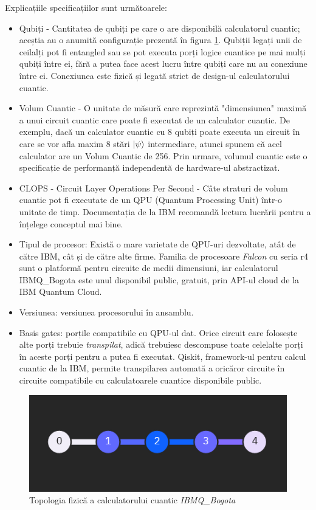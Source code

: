 \documentclass[12pt]{report}
\begin{document}
Explicațiile specificațiilor sunt următoarele:
\begin{itemize}
    \item Qubiți - Cantitatea de qubiți pe care o are disponibilă calculatorul cuantic; aceștia au o anumită configurație prezentă în figura \ref{fig:TopologieBogota}. Qubiții legați unii de ceilalți pot fi entangled sau se pot executa porți logice cuantice pe mai mulți qubiți între ei, fără a putea face acest lucru între qubiți care nu au conexiune între ei. Conexiunea este fizică și legată strict de design-ul calculatorului cuantic.
    \item Volum Cuantic - O unitate de măsură care reprezintă "dimensiunea" maximă a unui circuit cuantic care poate fi executat de un calculator cuantic. De exemplu, dacă un calculator cuantic cu 8 qubiți poate executa un circuit în care se vor afla maxim 8 stări $\ket{\psi}$ intermediare, atunci spunem că acel calculator are un Volum Cuantic de 256. Prin urmare, volumul cuantic este o specificație de performanță independentă de hardware-ul abstractizat.
    \item CLOPS - Circuit Layer Operations Per Second - Câte straturi de volum cuantic pot fi executate de un QPU (Quantum Processing Unit) într-o unitate de timp. Documentația de la IBM \cite{misc:web:DocumentatieIBMQ} recomandă lectura lucrării \cite{misc:paper:QSS:WackAndrewEtAl} pentru a înțelege conceptul mai bine.
    \item Tipul de procesor: Există o mare varietate de QPU-uri dezvoltate, atât de către IBM, cât și de către alte firme. Familia de procesoare \textit{Falcon} cu seria r4 sunt o platformă pentru circuite de medii dimensiuni, iar calculatorul IBMQ\_Bogota este unul disponibil public, gratuit, prin API-ul cloud de la IBM Quantum Cloud.
    \item Versiunea: versiunea procesorului în ansamblu.
    \item Basis gates: porțile compatibile cu QPU-ul dat. Orice circuit care folosește alte porți trebuie \textit{transpilat}, adică trebuiesc descompuse toate celelalte porți în aceste porți pentru a putea fi executat. Qiskit, framework-ul pentru calcul cuantic de la IBM, permite transpilarea automată a oricăror circuite în circuite compatibile cu calculatoarele cuantice disponibile public.
\end{itemize}

\begin{figure}[H]
    \centering
    \includegraphics{anexe/figuri/TopologieBogota.png}
    \caption{Topologia fizică a calculatorului cuantic \textit{IBMQ\_Bogota} }
    \label{fig:TopologieBogota}
\end{figure}
\pagebreak
\end{document}
